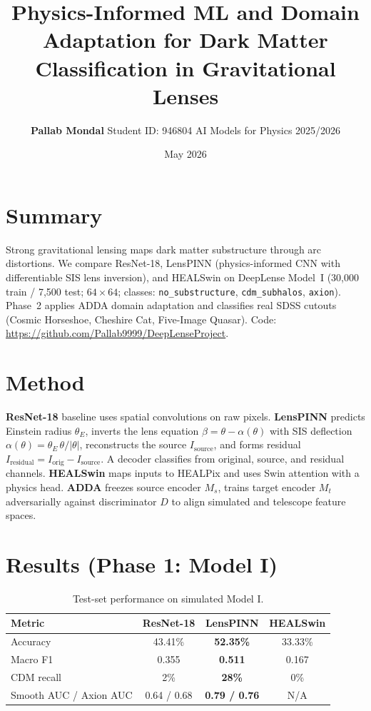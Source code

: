 \documentclass[10pt,a4paper]{article}
\title{\textbf{Physics-Informed ML and Domain Adaptation for Dark Matter Classification in Gravitational Lenses}}
\author{\textbf{Pallab Mondal} \quad Student ID: 946804 \quad AI Models for Physics 2025/2026}
\date{May 2026}
\begin{document}
\maketitle
\vspace{-1.2em}

\section*{Summary}
Strong gravitational lensing maps dark matter substructure through arc distortions. We compare ResNet-18, LensPINN (physics-informed CNN with differentiable SIS lens inversion), and HEALSwin on DeepLense Model~I (30{,}000 train / 7{,}500 test; $64\times64$; classes: \texttt{no\_substructure}, \texttt{cdm\_subhalos}, \texttt{axion}). Phase~2 applies ADDA domain adaptation and classifies real SDSS cutouts (Cosmic Horseshoe, Cheshire Cat, Five-Image Quasar). Code: \url{https://github.com/Pallab9999/DeepLenseProject}.

\section{Method}
\textbf{ResNet-18} baseline uses spatial convolutions on raw pixels. \textbf{LensPINN} predicts Einstein radius $\theta_E$, inverts the lens equation $\beta=\theta-\alpha(\theta)$ with SIS deflection $\alpha(\theta)=\theta_E\,\theta/|\theta|$, reconstructs the source $I_{\mathrm{source}}$, and forms residual $I_{\mathrm{residual}}=I_{\mathrm{orig}}-I_{\mathrm{source}}$. A decoder classifies from original, source, and residual channels. \textbf{HEALSwin} maps inputs to HEALPix and uses Swin attention with a physics head. \textbf{ADDA} freezes source encoder $M_s$, trains target encoder $M_t$ adversarially against discriminator $D$ to align simulated and telescope feature spaces.

\section{Results (Phase 1: Model I)}
\begin{table}[h]
\centering
\small
\caption{Test-set performance on simulated Model I.}
\begin{tabular}{lccc}
\toprule
\textbf{Metric} & \textbf{ResNet-18} & \textbf{LensPINN} & \textbf{HEALSwin} \\
\midrule
Accuracy & 43.41\% & \textbf{52.35\%} & 33.33\% \\
Macro F1 & 0.355 & \textbf{0.511} & 0.167 \\
CDM recall & 2\% & \textbf{28\%} & 0\% \\
Smooth AUC / Axion AUC & 0.64 / 0.68 & \textbf{0.79 / 0.76} & N/A \\
\bottomrule
\end{tabular}
\end{table}
\end{document}
